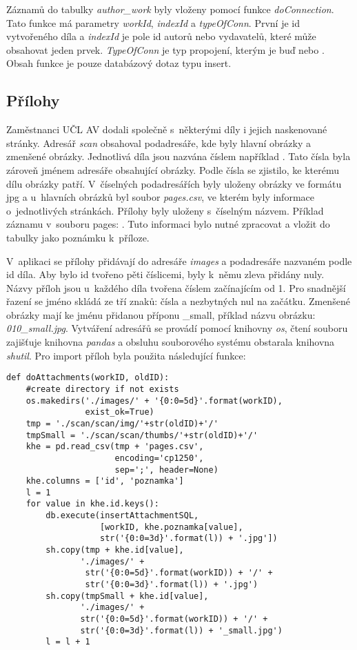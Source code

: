             Záznamů do tabulky \textit{author\_work} byly vloženy pomocí funkce \textit{doConnection}. Tato funkce má parametry \textit{workId}, \textit{indexId} a \textit{typeOfConn}. První je id vytvořeného díla a \textit{indexId} je pole id autorů nebo vydavatelů, které může obsahovat jeden prvek. \textit{TypeOfConn} je typ propojení, kterým je buď  nebo . Obsah funkce je pouze databázový dotaz typu insert.
            
        \subsection{Přílohy}
            Zaměstnanci UČL AV dodali společně s~některými díly i jejich naskenované stránky. Adresář \textit{scan} obsahoval  podadresáře, kde byly hlavní obrázky a zmenšené obrázky. Jednotlivá díla jsou nazvána číslem například . Tato čísla byla zároveň jménem adresáře obsahující obrázky. Podle čísla se zjistilo, ke kterému dílu obrázky patří. V~číselných podadresářích byly uloženy obrázky ve formátu jpg a u~hlavních obrázků byl soubor \textit{pages.csv}, ve kterém byly informace o~jednotlivých stránkách. Přílohy byly uloženy s~číselným názvem. Příklad záznamu v~souboru pages: . Tuto informaci bylo nutné zpracovat a vložit do tabulky jako poznámku k~příloze. 
            
            V~aplikaci se přílohy přidávají do adresáře \textit{images} a podadresáře nazvaném podle id díla. Aby bylo id tvořeno pěti číslicemi, byly k~němu zleva přidány nuly. Názvy příloh jsou u~každého díla tvořena číslem začínajícím od 1. Pro snadnější řazení se jméno skládá ze tří znaků: čísla a nezbytných nul na začátku. Zmenšené obrázky mají ke jménu přidanou příponu \_small, příklad názvu obrázku: \textit{010\_small.jpg}. Vytváření adresářů se provádí pomocí knihovny \textit{os}, čtení souboru zajišťuje knihovna \textit{pandas} a obsluhu souborového systému obstarala knihovna \textit{shutil}. Pro import příloh byla použita následující funkce:

\pagebreak
            \begin{verbatim}
def doAttachments(workID, oldID):
    #create directory if not exists
    os.makedirs('./images/' + '{0:0=5d}'.format(workID),
                exist_ok=True)
    tmp = './scan/scan/img/'+str(oldID)+'/'
    tmpSmall = './scan/scan/thumbs/'+str(oldID)+'/'
    khe = pd.read_csv(tmp + 'pages.csv',
                      encoding='cp1250',
                      sep=';', header=None)
    khe.columns = ['id', 'poznamka']
    l = 1
    for value in khe.id.keys():
        db.execute(insertAttachmentSQL,
                   [workID, khe.poznamka[value],
                   str('{0:0=3d}'.format(l)) + '.jpg'])
        sh.copy(tmp + khe.id[value], 
               './images/' + 
                str('{0:0=5d}'.format(workID)) + '/' +
                str('{0:0=3d}'.format(l)) + '.jpg')
        sh.copy(tmpSmall + khe.id[value], 
               './images/' + 
               str('{0:0=5d}'.format(workID)) + '/' +
               str('{0:0=3d}'.format(l)) + '_small.jpg')
        l = l + 1
            \end{verbatim}

